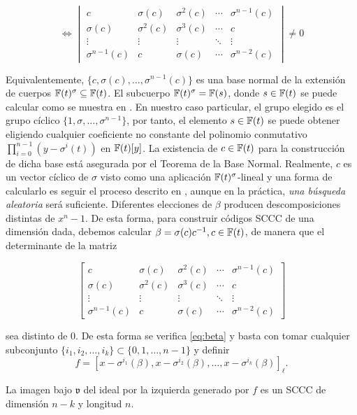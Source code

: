 \begin{ejemplo}
\[ \Leftrightarrow
\begin{vmatrix}
c & \sigma(c) & \sigma^2(c) & \cdots & \sigma^{n-1}(c) \\
\sigma(c) & \sigma^2(c) & \sigma^3(c) & \cdots & c\\
\vdots & \vdots & \vdots & \ddots & \vdots \\
\sigma^{n-1}(c) & c & \sigma(c) & \cdots & \sigma^{n-2}(c)
\end{vmatrix}
\neq 0\]

Equivalentemente, $\{c,\sigma(c),\dots,\sigma^{n-1}(c)\}$ es una base normal de la extensión de cuerpos $\mathbb{F}(t)^{\sigma} \subseteq \mathbb{F}(t)$. El subcuerpo $\mathbb{F}(t)^\sigma = \mathbb{F}(s)$, donde $s \in \mathbb{F}(t)$ se puede calcular como se muestra en \cite[Algoritmo 1]{Gutierrez2006}. En nuestro caso particular, el grupo elegido es el grupo cíclico $\{1,\sigma,\dots,\sigma^{n-1}\}$, por tanto, el elemento $s \in \mathbb{F}(t)$ se puede obtener eligiendo cualquier coeficiente no constante del polinomio conmutativo $\prod_{i=0}^{n-1}(y - \sigma^i(t))$ en $\mathbb{F}(t)[y]$. La existencia de $c \in \mathbb{F}(t)$ para la construcción de dicha base está asegurada por el Teorema de la Base Normal. Realmente, $c$ es un vector cíclico de $\sigma$ visto como una aplicación $\mathbb{F}(t)^{\sigma}$-lineal y una forma de calcularlo es seguir el proceso descrito en \cite[pp. 196-197 y pp. 293-294]{jacobson2012basic}, aunque en la práctica, \emph{una búsqueda aleatoria} será suficiente. Diferentes elecciones de $\beta$ producen descomposiciones distintas de $x^n - 1$. De esta forma, para construir códigos SCCC de una dimensión dada, debemos calcular $\beta = \sigma(c)c^{-1}, c \in \mathbb{F}(t)$, de manera que el determinante de la matriz

\[ 
\begin{bmatrix}
c & \sigma(c) & \sigma^2(c) & \cdots & \sigma^{n-1}(c) \\
\sigma(c) & \sigma^2(c) & \sigma^3(c) & \cdots & c\\
\vdots & \vdots & \vdots & \ddots & \vdots \\
\sigma^{n-1}(c) & c & \sigma(c) & \cdots & \sigma^{n-2}(c)
\end{bmatrix}
\]

sea distinto de $0$. De esta forma se verifica \eqref{eq:beta} y basta con tomar cualquier subconjunto $\{i_1,i_2,\dots,i_k\} \subset \{0,1,\dots,n-1\}$ y definir 
$$ f = [x - \sigma^{i_1}(\beta),x - \sigma^{i_2}(\beta),\dots,x - \sigma^{i_k}(\beta)]_\ell.$$

La imagen bajo $\mathfrak{v}$ del ideal por la izquierda generado por $f$ es un SCCC de dimensión $n - k$ y longitud $n$.
\end{ejemplo}

